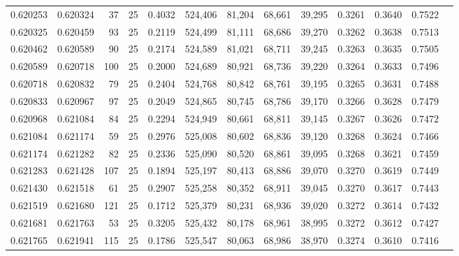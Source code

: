 \begin{tabular}{rrrrrrrrrrrrr}
0.620253 & 0.620324 &    37 &  25 &                                     0.4032 & 524,406 &  81,204 &  68,661 &  39,295 & 0.3261 & 0.3640 & 0.7522 \\
0.620325 & 0.620459 &    93 &  25 &                                     0.2119 & 524,499 &  81,111 &  68,686 &  39,270 & 0.3262 & 0.3638 & 0.7513 \\
0.620462 & 0.620589 &    90 &  25 &                                     0.2174 & 524,589 &  81,021 &  68,711 &  39,245 & 0.3263 & 0.3635 & 0.7505 \\
0.620589 & 0.620718 &   100 &  25 &                                     0.2000 & 524,689 &  80,921 &  68,736 &  39,220 & 0.3264 & 0.3633 & 0.7496 \\
0.620718 & 0.620832 &    79 &  25 &                                     0.2404 & 524,768 &  80,842 &  68,761 &  39,195 & 0.3265 & 0.3631 & 0.7488 \\
0.620833 & 0.620967 &    97 &  25 &                                     0.2049 & 524,865 &  80,745 &  68,786 &  39,170 & 0.3266 & 0.3628 & 0.7479 \\
0.620968 & 0.621084 &    84 &  25 &                                     0.2294 & 524,949 &  80,661 &  68,811 &  39,145 & 0.3267 & 0.3626 & 0.7472 \\
0.621084 & 0.621174 &    59 &  25 &                                     0.2976 & 525,008 &  80,602 &  68,836 &  39,120 & 0.3268 & 0.3624 & 0.7466 \\
0.621174 & 0.621282 &    82 &  25 &                                     0.2336 & 525,090 &  80,520 &  68,861 &  39,095 & 0.3268 & 0.3621 & 0.7459 \\
0.621283 & 0.621428 &   107 &  25 &                                     0.1894 & 525,197 &  80,413 &  68,886 &  39,070 & 0.3270 & 0.3619 & 0.7449 \\
0.621430 & 0.621518 &    61 &  25 &                                     0.2907 & 525,258 &  80,352 &  68,911 &  39,045 & 0.3270 & 0.3617 & 0.7443 \\
0.621519 & 0.621680 &   121 &  25 &                                     0.1712 & 525,379 &  80,231 &  68,936 &  39,020 & 0.3272 & 0.3614 & 0.7432 \\
0.621681 & 0.621763 &    53 &  25 &                                     0.3205 & 525,432 &  80,178 &  68,961 &  38,995 & 0.3272 & 0.3612 & 0.7427 \\
0.621765 & 0.621941 &   115 &  25 &                                     0.1786 & 525,547 &  80,063 &  68,986 &  38,970 & 0.3274 & 0.3610 & 0.7416 \\

\end{tabular}
